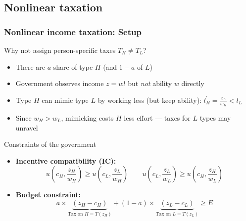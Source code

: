 \documentclass[aspectratio=169]{beamer}
\begin{document}
\subsection{Nonlinear taxation}
\begin{frame}
\frametitle{Nonlinear income taxation: Setup}
Why not assign person-specific taxes $T_H \neq T_L$?
\begin{itemize}\setlength\itemsep{3pt}
  \item There are $a$ share of type $H$ (and $1-a$ of $L$)
    \item Government observes income $z = wl$ but \textit{not} ability $w$ directly
    \item Type $H$ can mimic type $L$ by working less (but keep ability): $l_H^{'} = \frac{z_L}{w_H} < l_L$
    \item Since $w_H > w_L$, mimicking costs $H$ less effort --- taxes for $L$ types may unravel
\end{itemize}\medskip
 Constraints of the government
\begin{itemize}
\item \textbf{Incentive compatibility (IC):}
\[
u\!\left(c_H, \frac{z_H}{w_H}\right) \geq u\!\left(c_L, \frac{z_L}{w_H}\right) \qquad
u\!\left(c_L, \frac{z_L}{w_L}\right) \geq u\!\left(c_H, \frac{z_H}{w_L}\right)
\]
\item \textbf{Budget constraint:}
\[
a\times\underbrace{(z_H - c_H)}_{\text{Tax on $H=T(z_H)$}} + (1-a)\times\underbrace{(z_L - c_L)}_{\text{Tax on $L=T(z_L)$}} \geq E
\]
\end{itemize}
\end{frame}
\end{document}
